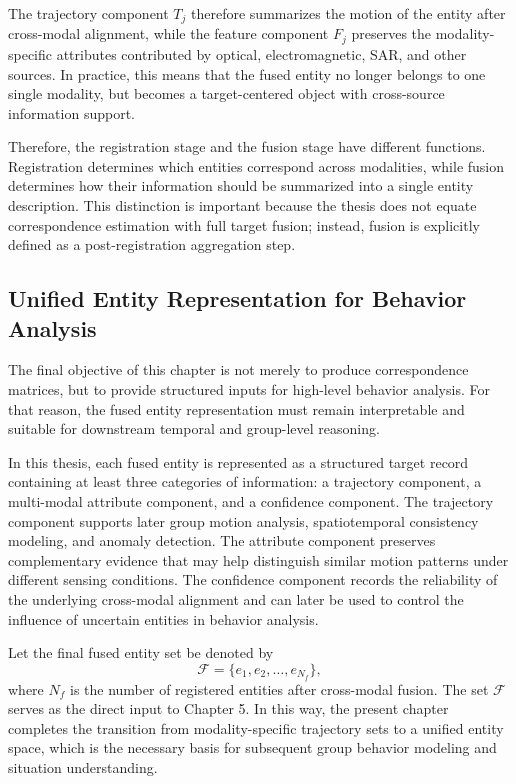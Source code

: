 The trajectory component \(T_j\) therefore summarizes the motion of the entity after cross-modal alignment, while the feature component \(F_j\) preserves the modality-specific attributes contributed by optical, electromagnetic, SAR, and other sources. In practice, this means that the fused entity no longer belongs to one single modality, but becomes a target-centered object with cross-source information support.

Therefore, the registration stage and the fusion stage have different functions. Registration determines which entities correspond across modalities, while fusion determines how their information should be summarized into a single entity description. This distinction is important because the thesis does not equate correspondence estimation with full target fusion; instead, fusion is explicitly defined as a post-registration aggregation step.

\subsection{Unified Entity Representation for Behavior Analysis}
The final objective of this chapter is not merely to produce correspondence matrices, but to provide structured inputs for high-level behavior analysis. For that reason, the fused entity representation must remain interpretable and suitable for downstream temporal and group-level reasoning.

In this thesis, each fused entity is represented as a structured target record containing at least three categories of information: a trajectory component, a multi-modal attribute component, and a confidence component. The trajectory component supports later group motion analysis, spatiotemporal consistency modeling, and anomaly detection. The attribute component preserves complementary evidence that may help distinguish similar motion patterns under different sensing conditions. The confidence component records the reliability of the underlying cross-modal alignment and can later be used to control the influence of uncertain entities in behavior analysis.

Let the final fused entity set be denoted by
\begin{equation}
  \mathcal{F} = \{e_1,e_2,\ldots,e_{N_f}\},
\end{equation}
where \(N_f\) is the number of registered entities after cross-modal fusion. The set \(\mathcal{F}\) serves as the direct input to Chapter 5. In this way, the present chapter completes the transition from modality-specific trajectory sets to a unified entity space, which is the necessary basis for subsequent group behavior modeling and situation understanding.


